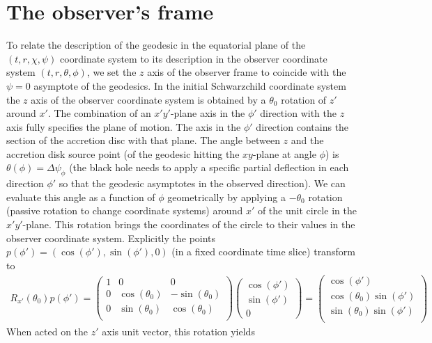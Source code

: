 \documentclass[10pt, a4paper]{article}
\begin{document}
\section{The observer's frame}
To relate the description of the geodesic in the equatorial plane of the $(t, r, \chi, \psi)$ coordinate system to its description in the observer coordinate system $(t, r, \theta, \phi)$, we set the $z$ axis of the observer frame to coincide with the $\psi=0$ asymptote of the geodesics. In the initial Schwarzchild coordinate system the $z$ axis of the observer coordinate system is obtained by a $\theta_0$ rotation of $z'$ around $x'$. The combination of an $x'y'$-plane axis in the $\phi'$ direction with the $z$ axis fully specifies the plane of motion. The axis in the $\phi'$ direction contains the section of the accretion disc with that plane. The angle between $z$ and the accretion disk source point (of the geodesic hitting the $xy$-plane at angle $\phi$) is $\theta(\phi) = \Delta \psi_\phi$ (the black hole needs to apply a specific partial deflection in each direction $\phi'$ so that the geodesic asymptotes in the observed direction). We can evaluate this angle as a function of $\phi$ geometrically by applying a $-\theta_0$ rotation (passive rotation to change coordinate systems) around $x'$ of the unit circle in the $x'y'$-plane. This rotation brings the coordinates of the circle to their values in the observer coordinate system. Explicitly the points $p(\phi') = (\cos(\phi'), \sin(\phi'), 0)$ (in a fixed coordinate time slice) transform to 
\begin{align*}
  R_{x'}(\theta_0) p(\phi') 
  =
  \begin{pmatrix}
    1 & 0 & 0\\
    0 & \cos(\theta_0) & -\sin(\theta_0)\\
    0 & \sin(\theta_0) & \cos(\theta_0)\\
  \end{pmatrix}
  \begin{pmatrix}
    \cos(\phi')\\
    \sin(\phi')\\
    0
  \end{pmatrix}
  = 
  \begin{pmatrix}
    \cos(\phi')\\
    \cos(\theta_0)\sin(\phi')\\
    \sin(\theta_0)\sin(\phi')\\
  \end{pmatrix}
\end{align*}
When acted on the $z'$ axis unit vector, this rotation yields
\end{document}
